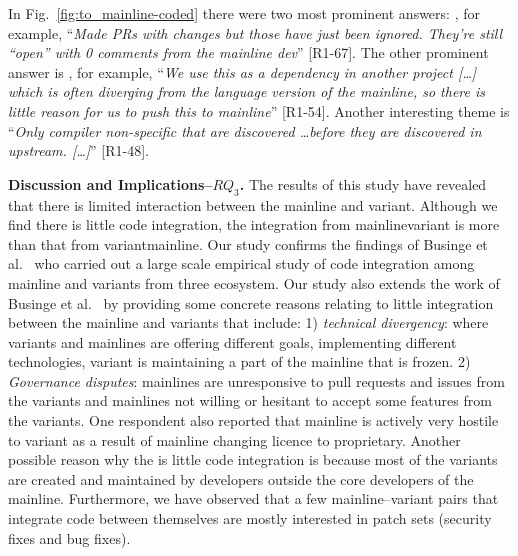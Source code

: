 In Fig.~\ref{fig:to_mainline-coded} there were two most prominent answers: , for example, ``\textit{Made PRs with changes but those have just been ignored. They're still ``open'' with 0 comments from the mainline dev}'' [R1-67]. The other prominent answer is , for example, ``\emph{We use this as a dependency in another project [\ldots] which is often diverging from the language version of the mainline, so there is little reason for us to push this to mainline}'' [R1-54]. Another interesting theme is ``\emph{Only compiler non-specific that are discovered \ldots before they are discovered in upstream. [\ldots]}'' [R1-48].

\nd \textbf{Discussion and Implications--$RQ_3$.}
The results of this study have revealed that there is limited interaction between the mainline and variant.
Although we find there is little code integration, the integration from mainline\ra variant is more than that from variant\ra mainline. 
Our study confirms the findings of Businge et al.~\cite{businge:emse:2021} who carried out a large scale empirical study of code integration among mainline and variants from three ecosystem. Our study also extends the work of Businge et al.~\cite{businge:emse:2021} by providing some concrete reasons relating to little integration between the mainline and variants that include: 1) \textit{technical divergency}: where variants and mainlines are offering different goals, implementing different technologies, variant is maintaining a part of the mainline that is frozen. 2) \textit{Governance disputes}: mainlines are unresponsive to pull requests and issues from the variants and  mainlines not willing or hesitant to accept some features from the variants. One respondent also reported that mainline is actively very hostile to variant as a result of mainline changing licence to proprietary.
Another possible reason why the is little code integration is because most of the variants are created and maintained by developers outside the core developers of the mainline.
Furthermore, we have observed that a few mainline--variant pairs that integrate code between themselves are mostly interested in patch sets (security fixes and bug fixes).

